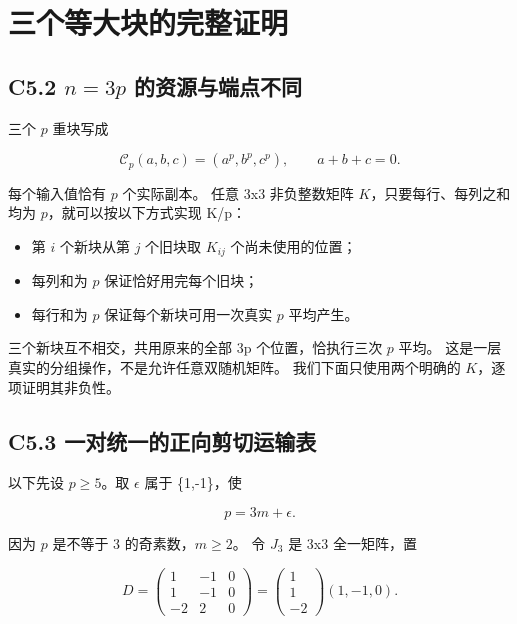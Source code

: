 \section{三个等大块的完整证明}\label{construct:three-blocks}
\subsection*{\texorpdfstring{{C5.2} {\ensuremath{n=3p}} {的资源与端点不同}}{C5.2  的资源与端点不同}}\label{C5-h28}

{三个} {\ensuremath{p}} {重块写成}

\[
\mathcal C_p(a,b,c)=(a^p,b^p,c^p),\qquad a+b+c=0.
\]

{每个输入值恰有} {\ensuremath{p}} {个实际副本。} {任意} {3x3} {非负整数矩阵} {\ensuremath{K}，只要每行、每列之和均为} {\ensuremath{p}，就可以按以下方式实现} {K/p：}

\begin{itemize}
\tightlist
\item
  {第} {\ensuremath{i}} {个新块从第} {\ensuremath{j}} {个旧块取} {\ensuremath{K_{ij}}} {个尚未使用的位置；}
\item
  {每列和为} {\ensuremath{p}} {保证恰好用完每个旧块；}
\item
  {每行和为} {\ensuremath{p}} {保证每个新块可用一次真实} {\ensuremath{p}} {平均产生。}
\end{itemize}

{三个新块互不相交，共用原来的全部} {3p} {个位置，恰执行三次} {\ensuremath{p}} {平均。} {这是一层真实的分组操作，不是允许任意双随机矩阵。} {我们下面只使用两个明确的} {\ensuremath{K}，逐项证明其非负性。}

\subsection*{\texorpdfstring{{C5.3} {一对统一的正向剪切运输表}}{C5.3 一对统一的正向剪切运输表}}\label{C5-h29}

{以下先设} {\ensuremath{p\ge 5}。取} {\ensuremath{\epsilon }} {属于} {\{1,-1\}，使}

\[
p=3m+\epsilon.
\]

{因为} {\ensuremath{p}} {是不等于} {3} {的奇素数，\ensuremath{m\ge 2}。} {令} {\ensuremath{J_{3}}} {是} {3x3} {全一矩阵，置}

\[
D=\begin{pmatrix}
1&-1&0\\
1&-1&0\\
-2&2&0
\end{pmatrix}
=\begin{pmatrix}1\\1\\-2\end{pmatrix}(1,-1,0).
\]

